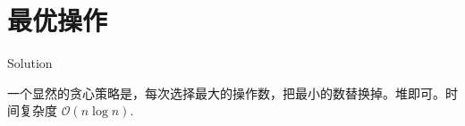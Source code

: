 \section{最优操作}

\begin{frame}{Solution}

一个显然的贪心策略是，每次选择最大的操作数，把最小的数替换掉。堆即可。时间复杂度 $\mathcal O(n\log n)$.

\end{frame}
